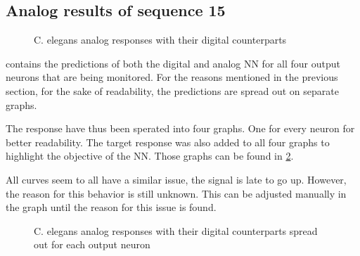 \subsection{Analog results of sequence 15}
\label{subsec:analog15Celegans}

\begin{figure}[H]
  \centering
  
  \caption{\acs{C. elegans} analog responses with their digital counterparts}
  \label{graph:celegansAnalog1}
\end{figure}

 contains the predictions of both the digital and analog \ac{NN} for all four output neurons that are being monitored. For the reasons mentioned in the previous section, for the sake of readability, the predictions are spread out on separate graphs.

The response have thus been sperated into four graphs. One for every neuron for better readability. The target response was also added to all four graphs to highlight the objective of the \ac{NN}. Those graphs can be found in \cref{graph:spread15Celegans}.

All curves seem to all have a similar issue, the signal is late to go up. However, the reason for this behavior is still unknown. This can be adjusted manually in the graph until the reason for this issue is found.

\begin{figure}[H]
  \centering
  \begin{minipage}{\columnwidth}
    \hfill
  \end{minipage}
  \begin{minipage}{\columnwidth}
    \hfill
  \end{minipage}
  \caption{\ac{C. elegans} analog responses with their digital counterparts spread out for each output neuron}
  \label{graph:spread15Celegans}
\end{figure}

